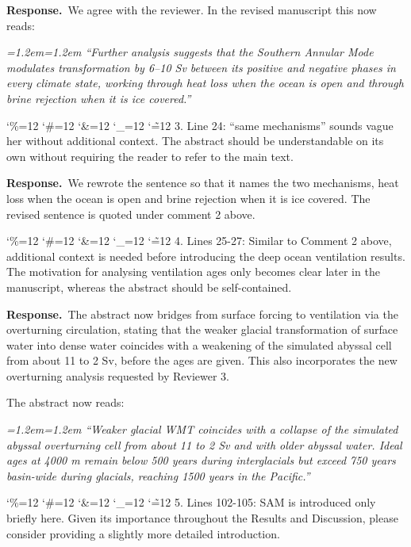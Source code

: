 \documentclass[11pt,a4paper]{article}
\newcommand{\comment}[1]{\par\medskip\noindent\color{black}\begingroup\catcode`\%=12 \catcode`\#=12 \catcode`\&=12 \catcode`\_=12 \catcode`\~=12 \commentbody}
\newcommand{\commentbody}[1]{#1\endgroup\par\smallskip}
\newcommand{\response}{\par\noindent\color{chgcol}\textbf{Response.}\ }
\newenvironment{change}{\par\smallskip\color{chgcol}\small\itshape\leftskip=1.2em\rightskip=1.2em\noindent\ignorespaces}{\par\smallskip}
\begin{document}
\response We agree with the reviewer. In the revised manuscript this now reads:

\begin{change}
``Further analysis suggests that the Southern Annular Mode modulates transformation by 6--10 Sv between its positive and negative phases in every climate state, working through heat loss when the ocean is open and through brine rejection when it is ice covered.''
\end{change}

\comment{R1}{3. Line 24: ``same mechanisms'' sounds vague her without additional context. The abstract should be understandable on its own without requiring the reader to refer to the main text.}

\response We rewrote the sentence so that it names the two mechanisms, heat loss when the ocean is open and brine rejection when it is ice covered. The revised sentence is quoted under comment 2 above.


\comment{R1}{4. Lines 25-27: Similar to Comment 2 above, additional context is needed before introducing the deep ocean ventilation results. The motivation for analysing ventilation ages only becomes clear later in the manuscript, whereas the abstract should be self-contained.}

\response The abstract now bridges from surface forcing to ventilation via the overturning circulation, stating that the weaker glacial transformation of surface water into dense water coincides with a weakening of the simulated abyssal cell from about 11 to 2 Sv, before the ages are given. This also incorporates the new overturning analysis requested by Reviewer 3.

The abstract now reads:

\begin{change}
``Weaker glacial WMT coincides with a collapse of the simulated abyssal overturning cell from about 11 to 2 Sv and with older abyssal water. Ideal ages at 4000 m remain below 500 years during interglacials but exceed 750 years basin-wide during glacials, reaching 1500 years in the Pacific.''
\end{change}

\comment{R1}{5. Lines 102-105: SAM is introduced only briefly here. Given its importance throughout the Results and Discussion, please consider providing a slightly more detailed introduction.}
\end{document}
